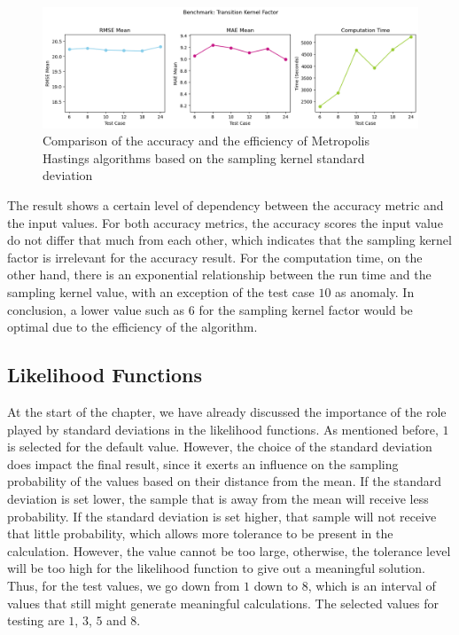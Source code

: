 \begin{figure}[H]
    \centering
    \includegraphics[width=1\textwidth]{figures/basic_mh/benchmark/sensitivity_transition.png}
    \captionsetup{width=.8\textwidth}
    \caption{Comparison of the accuracy and the efficiency of Metropolis Hastings algorithms based on the sampling kernel standard deviation}
    \label{fig:enter-label}
\end{figure}

The result shows a certain level of dependency between the accuracy metric and the input values. For both accuracy metrics, the accuracy scores the input value do not differ that much from each other, which indicates that the sampling kernel factor is irrelevant for the accuracy result. For the computation time, on the other hand, there is an exponential relationship between the run time and the sampling kernel value, with an exception of the test case $10$ as anomaly. In conclusion, a lower value such as $6$ for the sampling kernel factor would be optimal due to the efficiency of the algorithm.

\subsection{Likelihood Functions}
At the start of the chapter, we have already discussed the importance of the role played by standard deviations in the likelihood functions. As mentioned before, $1$ is selected for the default value. However, the choice of the standard deviation does impact the final result, since it exerts an influence on the sampling probability of the values based on their distance from the mean. If the standard deviation is set lower, the sample that is away from the mean will receive less probability. If the standard deviation is set higher, that sample will not receive that little probability, which allows more tolerance to be present in the calculation. However, the value cannot be too large, otherwise, the tolerance level will be too high for the likelihood function to give out a meaningful solution. Thus, for the test values, we go down from $1$ down to $8$, which is an interval of values that still might generate meaningful calculations. The selected values for testing are $1$, $3$, $5$ and $8$. 

